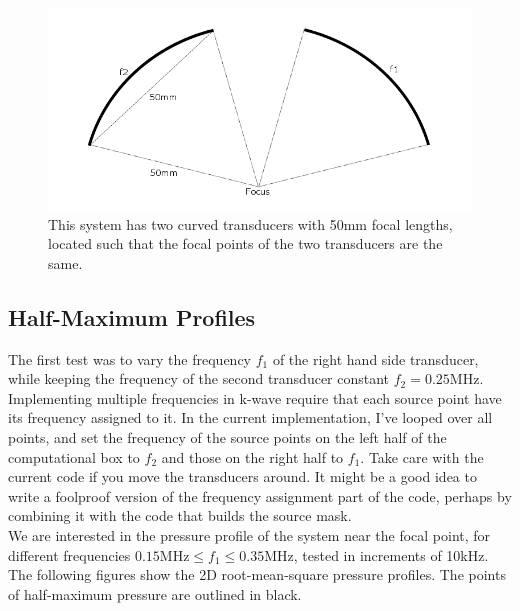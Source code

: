 \documentclass[10pt,a4paper]{article}
\begin{document}
\begin{figure}[!h]
\centering
\includegraphics[scale=0.5]{setup1.png}
\caption{This system has two curved transducers with 50mm focal lengths, located such that the focal points of the two transducers are the same.} \label{setup1}
\centering
\end{figure}

\subsection*{Half-Maximum Profiles}

The first test was to vary the frequency $f_1$ of the right hand side transducer, while keeping the frequency of the second transducer constant $f_2 = 0.25$MHz. Implementing multiple frequencies in k-wave require that each source point have its frequency assigned to it. In the current implementation, I've looped over all points, and set the frequency of the source points on the left half of the computational box to $f_2$ and those on the right half to $f_1$. Take care with the current code if you move the transducers around. It might be a good idea to write a foolproof version of the frequency assignment part of the code, perhaps by combining it with the code that builds the source mask.\\

We are interested in the pressure profile of the system near the focal point, for different frequencies $0.15 \text{MHz} \leq f_1 \leq 0.35 \text{MHz}$, tested in increments of 10kHz. The following figures show the 2D root-mean-square pressure profiles. The points of half-maximum pressure are outlined in black.
\end{document}
